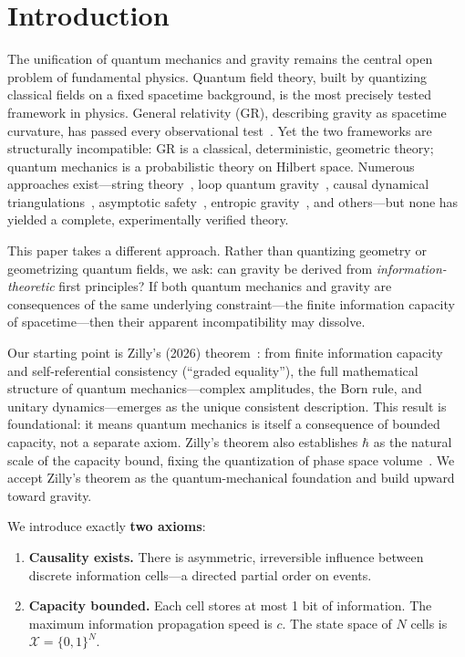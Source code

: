 \documentclass[aps,prd,twocolumn,showpacs,superscriptaddress,preprintnumbers]{revtex4-2}
\begin{document}
\section{Introduction}
\label{sec:intro}

The unification of quantum mechanics and gravity remains the central open problem of fundamental physics.
Quantum field theory, built by quantizing classical fields on a fixed spacetime background, is the most precisely tested framework in physics.
General relativity (GR), describing gravity as spacetime curvature, has passed every observational test~\cite{Will:2014}.
Yet the two frameworks are structurally incompatible: GR is a classical, deterministic, geometric theory; quantum mechanics is a probabilistic theory on Hilbert space.
Numerous approaches exist---string theory~\cite{Green:1987sp,Polchinski:1998rq}, loop quantum gravity~\cite{Rovelli:2004tv,Ashtekar:2004eh}, causal dynamical triangulations~\cite{Ambjorn:2001cv}, asymptotic safety~\cite{Weinberg:1979,Reuter:2012}, entropic gravity~\cite{Verlinde:2010hp,Jacobson:1995ab}, and others---but none has yielded a complete, experimentally verified theory.

This paper takes a different approach.
Rather than quantizing geometry or geometrizing quantum fields, we ask: can gravity be derived from \emph{information-theoretic} first principles?
If both quantum mechanics and gravity are consequences of the same underlying constraint---the finite information capacity of spacetime---then their apparent incompatibility may dissolve.

Our starting point is Zilly's (2026) theorem~\cite{Zilly:2026}: from finite information capacity and self-referential consistency (``graded equality''), the full mathematical structure of quantum mechanics---complex amplitudes, the Born rule, and unitary dynamics---emerges as the unique consistent description.
This result is foundational: it means quantum mechanics is itself a consequence of bounded capacity, not a separate axiom.
Zilly's theorem also establishes $\hbar$ as the natural scale of the capacity bound, fixing the quantization of phase space volume~\cite{Zilly:2026}.
We accept Zilly's theorem as the quantum-mechanical foundation and build upward toward gravity.

We introduce exactly \textbf{two axioms}:

\begin{enumerate}
    \item[A1.] \textbf{Causality exists.} There is asymmetric, irreversible influence between discrete information cells---a directed partial order on events.
    \item[A2.] \textbf{Capacity bounded.} Each cell stores at most 1 bit of information. The maximum information propagation speed is $c$. The state space of $N$ cells is $\mathcal{X}=\{0,1\}^N$.
\end{enumerate}
\end{document}
